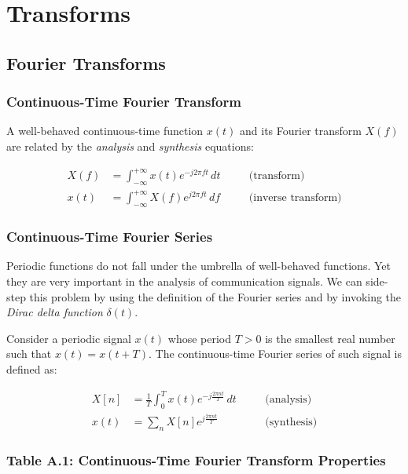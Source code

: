 \section*{Transforms}

\subsection*{Fourier Transforms}

\subsubsection*{Continuous-Time Fourier Transform}

A well-behaved continuous-time function $x(t)$ and its Fourier transform $X(f)$ are related by the \textit{analysis} and \textit{synthesis} equations:

\begin{align}
X(f) &= \int_{-\infty}^{+\infty} x(t)e^{-j 2\pi f t}\,dt 
\quad &&\text{(transform)} \tag{A.1} \\[8pt]
x(t) &= \int_{-\infty}^{+\infty} X(f)e^{j 2\pi f t}\,df 
\quad &&\text{(inverse transform)} \tag{A.2}
\end{align}

\subsubsection*{Continuous-Time Fourier Series}

Periodic functions do not fall under the umbrella of well-behaved functions. Yet they are very important in the analysis of communication signals. We can side-step this problem by using the definition of the Fourier series and by invoking the \textit{Dirac delta function} $\delta(t)$.

Consider a periodic signal $x(t)$ whose period $T > 0$ is the smallest real number such that $x(t) = x(t + T)$. The continuous-time Fourier series of such signal is defined as:

\begin{align}
X[n] &= \frac{1}{T} \int_{0}^{T} x(t)e^{-j\frac{2\pi n t}{T}}\,dt 
\quad &&\text{(analysis)} \tag{A.3} \\[8pt]
x(t) &= \sum_{n} X[n]e^{j\frac{2\pi n t}{T}} 
\quad &&\text{(synthesis)} \tag{A.4}
\end{align}

\subsubsection*{Table A.1: Continuous-Time Fourier Transform Properties}

